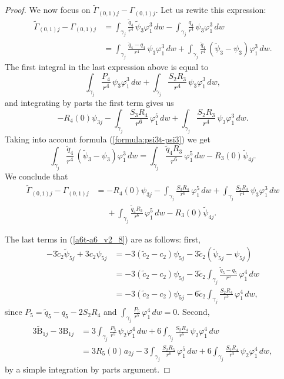 \begin{proof}
We now focus on $\widetilde{\Gamma}_{(0,1)j}-\Gamma_{(0,1)j}$. Let us rewite this expression:
\begin{align*} 
 \widetilde{\Gamma}_{(0,1)j}-\Gamma_{(0,1)j} &= \int_{\gamma_j}\frac{\tilde{q}_4}{r^4}\,\tilde{\psi}_3\varphi_1^3\,dw-\int_{\gamma_j}\frac{q_4}{r^4}\,\psi_3\varphi_1^3\,dw\\
&= \int_{\gamma_j}\frac{\tilde{q}_4-q_4}{r^4}\,\psi_3\varphi_1^3\,dw+\int_{\gamma_j}\frac{\tilde{q}_4}{r^4}\,(\tilde{\psi}_3-\psi_3)\varphi_1^3\,dw.
\end{align*}
The first integral in the last expression above is equal to
\[ \int_{\gamma_j}\frac{P_4}{r^4}\,\psi_3\varphi_1^3\,dw+\int_{\gamma_j}\frac{S_2R_3}{r^4}\,\psi_3\varphi_1^3\,dw,\]
and integrating by parts the first term gives us
\[ -R_4(0)\psi_{3j} -\int_{\gamma_j}\frac{S_3R_4}{r^6}\,\varphi_1^5\,dw +\int_{\gamma_j}\frac{S_2R_3}{r^4}\,\psi_3\varphi_1^3\,dw. \]
Taking into account formula (\ref{formula:psi3t-psi3}) we get
\[ \int_{\gamma_j}\frac{\tilde{q}_4}{r^4}\,(\tilde{\psi}_3-\psi_3)\varphi_1^3\,dw=\int_{\gamma_j}\frac{\tilde{q}_4R_3}{r^6}\,\varphi_1^5\,dw-R_3(0)\tilde{\psi}_{4j}. \]
We conclude that
\begin{align}
 \widetilde{\Gamma}_{(0,1)j}-\Gamma_{(0,1)j} &= -R_4(0)\psi_{3j} -\int_{\gamma_j}\frac{S_3R_4}{r^6}\,\varphi_1^5\,dw +\int_{\gamma_j}\frac{S_2R_3}{r^4}\,\psi_3\varphi_1^3\,dw \nonumber \\
&\phantom{=} +\int_{\gamma_j}\frac{\tilde{q}_4R_3}{r^6}\,\varphi_1^5\,dw-R_3(0)\tilde{\psi}_{4j}. \label{eq:Gamma0,1t-Gamma0,1}
\end{align}

The last terms in (\ref{a6t-a6_v2_8}) are as follows: first,
\begin{align}
 -3\tilde{c}_2\tilde{\psi}_{5j}+3c_2\psi_{5j} &= -3(\tilde{c}_2-c_2)\psi_{5j}-3\tilde{c}_2(\tilde{\psi}_{5j}-\psi_{5j}) \nonumber \\
&= -3(\tilde{c}_2-c_2)\psi_{5j}-3\tilde{c}_2\int_{\gamma_j}\frac{\tilde{q}_5-q_5}{r^5}\,\varphi_1^4\,dw \nonumber \\
&= -3(\tilde{c}_2-c_2)\psi_{5j}-6\tilde{c}_2\int_{\gamma_j}\frac{S_2R_4}{r^5}\,\varphi_1^4\,dw, \label{eq:psi5t-psi5}
\end{align}
since $P_5=\tilde{q}_5-q_5-2S_2R_4$ and $\int_{\gamma_j}\frac{P_5}{r^5}\,\varphi_1^4\,dw=0$. Second,
\begin{align}
 3\widetilde{\mathrm{B}}_{1j}-3\mathrm{B}_{1j} &= 3\int_{\gamma_j}\frac{P_5}{r^5}\,\psi_2\varphi_1^4\,dw+6\int_{\gamma_j}\frac{S_2R_4}{r^5}\,\psi_2\varphi_1^4\,dw \nonumber \\
&= 3R_5(0)a_{2j}-3\int_{\gamma_j}\frac{S_2R_5}{r^6}\,\varphi_1^5\,dw+6\int_{\gamma_j}\frac{S_2R_4}{r^5}\,\psi_2\varphi_1^4\,dw, \label{eq:Beta1t-Beta1}
\end{align}
by a simple integration by parts argument.



\end{proof}
